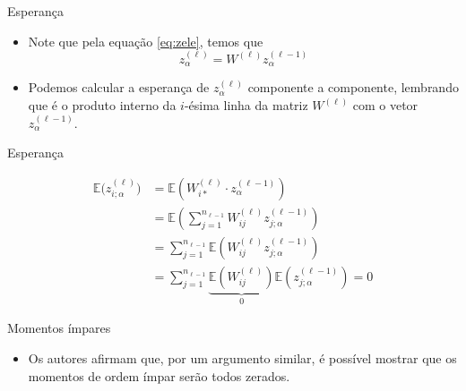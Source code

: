 \documentclass{beamer}
\newcommand{\EE}{\mathbb{E}}
\begin{document}
\begin{frame}{Esperança}
	\begin{itemize}
		\item Note que pela equação \eqref{eq:zele}, temos que 
		\begin{equation*}\tag{3.2'}\label{eq:zele1}
		z^{(\ell)}_{\alpha} = W^{(\ell)} z^{(\ell -1)}_\alpha
		\end{equation*}
		\item Podemos calcular a esperança de $z^{(\ell)}_{\alpha}$ componente a componente, lembrando que é o produto interno da $i$-ésima linha da matriz $W^{(\ell)}$ com o vetor $z^{(\ell -1)}_\alpha$.
	\end{itemize}
\end{frame}
\begin{frame}{Esperança}
	
	\begin{align*}
		\EE\big(z^{(\ell)}_{i;\alpha}\big) &= \EE\left(W_{i*}^{(\ell)} \cdot z^{(\ell -1)}_\alpha\right) \\%
		&= \EE\left(\sum_{j=1}^{n_{\ell-1}} W_{ij}^{(\ell)}z^{(\ell -1)}_{j;\alpha}\right) \\%
		&=\sum_{j=1}^{n_{\ell-1}}\EE\left( W_{ij}^{(\ell)}z^{(\ell -1)}_{j;\alpha}\right) \\%
		&= \sum_{j=1}^{n_{\ell-1}} \underset{0}{\underbrace{\EE\left(W_{ij}^{(\ell)}\right)}} \EE\left(z^{(\ell -1)}_{j;\alpha}\right) = 0 \tag{3.6} \label{eq:media} %
	\end{align*} 
\end{frame}

\begin{frame}{Momentos ímpares}
	\begin{itemize}
		\item Os autores afirmam que, por um argumento similar, é possível mostrar que os momentos de ordem ímpar serão todos zerados. 
	\end{itemize}
\end{frame}
\end{document}
